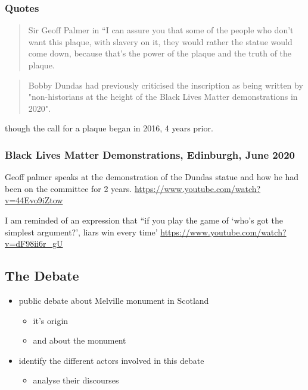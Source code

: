 \subsubsection{Quotes}
\begin{quotation}{Sir Geoff Palmer in \cite{anderson_2021}}
    “I can assure you that some of the people who don’t want this plaque, with slavery on it, they would rather the statue would come down, because that’s the power of the plaque and the truth of the plaque.
\end{quotation}
\begin{quote}
    Bobby Dundas had previously criticised the inscription as being written by "non-historians at the height of the Black Lives Matter demonstrations in 2020".
\end{quote}\cite{bbc_2024} though the call for a plaque began in 2016, 4 years prior.

\subsubsection{Black Lives Matter Demonstrations, Edinburgh, June 2020}

Geoff palmer speaks at the demonstration of the Dundas statue and how he had been on the committee for 2 years. \url{https://www.youtube.com/watch?v=44Evo9iZtow}

I am reminded of an expression that ``if you play the game of `who's got the simplest argument?', liars win every time' \url{https://www.youtube.com/watch?v=dF98ii6r_gU}

\subsection{The Debate}

\begin{itemize}
    \item public debate about Melville monument in Scotland
    \begin{itemize}
        \item it's origin
    \end{itemize}
    \begin{itemize}
        \item and about the monument
    \end{itemize}
    \item identify the different actors involved in this debate
    \begin{itemize}
        \item analyse their discourses
    \end{itemize}
\end{itemize}

